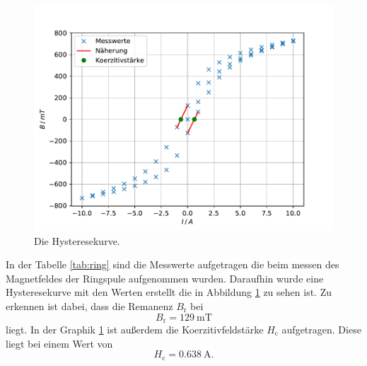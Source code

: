 \begin{figure}
\centering
\includegraphics[width=\textwidth]{content/data/plot_ring.pdf}
\caption{Die Hysteresekurve.}
\label{fig:ring}
\end{figure}

In der Tabelle \ref{tab:ring} sind die Messwerte aufgetragen die beim messen des Magnetfeldes der Ringspule aufgenommen wurden.
Daraufhin wurde eine Hysteresekurve mit den Werten erstellt die in Abbildung \ref{fig:ring} zu sehen ist.
Zu erkennen ist dabei, dass die Remanenz $B_\text{r}$ bei 
\begin{equation*}
  B_\text{r} =\SI{129}{\milli\tesla}
\end{equation*}
liegt.
In der Graphik \ref{fig:ring} ist außerdem die Koerzitivfeldstärke $H_\text{c}$ aufgetragen.
Diese liegt bei einem Wert von
\begin{equation*}
  H_\text{c} =\SI{0.638}{\ampere}.
\end{equation*}
